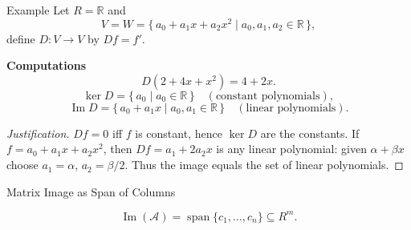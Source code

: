 \begin{frame}{Example}
\vspace{-0.3cm}
Let $R=\mathbb{R}$ and
\[
V=W=\{\, a_0+a_1 x+a_2 x^2 \mid a_0,a_1,a_2\in\mathbb{R}\,\},
\]
define $D:V\to V$ by $Df=f'$.

\textbf{Computations}
\[
D(2+4x+x^2)=4+2x.
\]
\[
\ker D=\{\, a_0 \mid a_0\in\mathbb{R}\,\} \quad (\text{constant polynomials}),
\]
\[
\operatorname{Im} D=\{\, a_0+a_1 x \mid a_0,a_1\in\mathbb{R}\,\} \quad (\text{linear polynomials}).
\]


\begin{proof}[Justification]
$Df=0$ iff $f$ is constant, hence $\ker D$ are the constants. If $f=a_0+a_1x+a_2 x^2$, then $Df=a_1+2a_2 x$ is any linear polynomial: given $\alpha+\beta x$ choose $a_1=\alpha$, $a_2=\beta/2$. Thus the image equals the set of linear polynomials.
\end{proof}
\end{frame}


\begin{frame}{Matrix Image as Span of Columns}

\begin{center}
\end{center}
\[
\operatorname{Im}(\mathcal A)=\operatorname{span}\{c_1,\dots,c_n\}\subseteq R^m.
\]
\end{frame}


